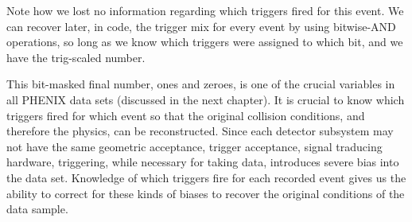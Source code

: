 Note how we lost no information regarding which triggers fired for this event.
We can recover later, in code, the trigger mix for every event by using
bitwise-AND operations, so long as we know which triggers were assigned to which
bit, and we have the trig-scaled number.

This bit-masked final number, ones and zeroes, is one of the crucial variables
in all PHENIX data sets (discussed in the next chapter). It is crucial to know
which triggers fired for which event so that the original collision conditions,
and therefore the physics, can be reconstructed. Since each detector subsystem
may not have the same geometric acceptance, trigger acceptance, signal
traducing hardware, triggering, while necessary for taking data, introduces
severe bias into the data set. Knowledge of which triggers fire for each
recorded event gives us the ability to correct for these kinds of biases to
recover the original conditions of the data sample.
